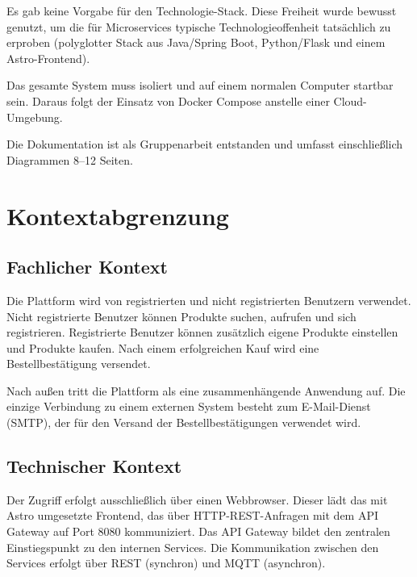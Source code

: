 \documentclass[11pt,a4paper]{article}
\begin{document}
\begin{description}[leftmargin=1.5em, itemsep=2pt]
  \item[Freie Technologiewahl]
  Es gab keine Vorgabe f\"ur den Technologie-Stack. Diese Freiheit wurde
  bewusst genutzt, um die f\"ur Microservices typische
  Technologieoffenheit tats\"achlich zu erproben (polyglotter Stack aus
  Java/Spring Boot, Python/Flask und einem Astro-Frontend).
  \item[Lokale Ausf\"uhrbarkeit]
  Das gesamte System muss isoliert und auf einem normalen Computer
  startbar sein. Daraus folgt der Einsatz von Docker Compose anstelle
  einer Cloud-Umgebung.
  \item[Organisatorisch]
  Die Dokumentation ist als Gruppenarbeit entstanden und umfasst
  einschlie\ss{}lich Diagrammen 8--12 Seiten.
\end{description}

\section{Kontextabgrenzung}

\subsection{Fachlicher Kontext}

Die Plattform wird von registrierten und nicht registrierten Benutzern
verwendet. Nicht registrierte Benutzer k\"onnen Produkte suchen, aufrufen
und sich registrieren. Registrierte Benutzer k\"onnen zus\"atzlich eigene
Produkte einstellen und Produkte kaufen. Nach einem erfolgreichen Kauf
wird eine Bestellbest\"atigung versendet.

Nach au\ss{}en tritt die Plattform als eine zusammenh\"angende Anwendung
auf. Die einzige Verbindung zu einem externen System besteht zum
E-Mail-Dienst (SMTP), der f\"ur den Versand der Bestellbest\"atigungen
verwendet wird.

\subsection{Technischer Kontext}

Der Zugriff erfolgt ausschlie\ss{}lich \"uber einen Webbrowser. Dieser
l\"adt das mit Astro umgesetzte Frontend, das \"uber HTTP-REST-Anfragen
mit dem API Gateway auf Port 8080 kommuniziert. Das API Gateway bildet
den zentralen Einstiegspunkt zu den internen Services. Die Kommunikation
zwischen den Services erfolgt \"uber REST (synchron) und MQTT
(asynchron).
\end{document}
